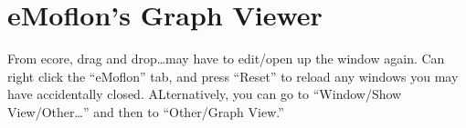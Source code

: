 \newpage
\section{eMoflon's Graph Viewer}
\genHeader

From ecore, drag and drop\ldots may have to edit/open up the window again. Can right click the ``eMoflon'' tab, and press ``Reset'' to reload any windows you
may have accidentally closed. ALternatively, you can go to ``Window/Show View/Other\ldots'' and then to ``Other/Graph View.''

